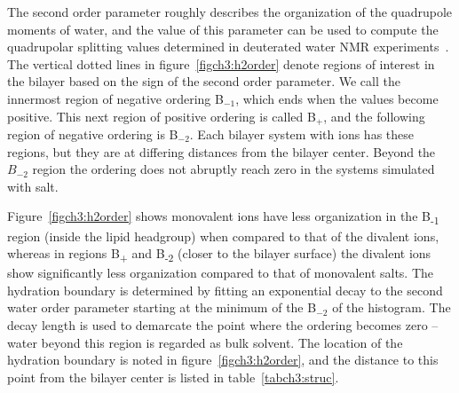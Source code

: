 The second order parameter
roughly describes the organization of the quadrupole moments of water, {and the value of this parameter
can be used to compute the} quadrupolar splitting values determined in 
deuterated water NMR experiments~\cite{aaman:2003,kruczek:2017:ether}.
The vertical dotted lines in figure~\ref{figch3:h2order} denote regions of interest in the bilayer 
based on the {sign} of the second order parameter. We call the innermost region of negative ordering
B$_{-1}$, which ends when the values become positive. This next region of positive ordering is
called B$_{+}$, and the following region of negative ordering is B$_{-2}$. Each bilayer system with ions
has these regions, but they are at differing distances from the bilayer center.
Beyond the $B_{-2}$ region the ordering does not abruptly reach zero in the systems
simulated with salt.

{
    Figure~\ref{figch3:h2order} shows monovalent ions have 
    less organization in the B\textsubscript{-1} region (inside the lipid headgroup) when compared to that of the divalent ions,  
    whereas in regions B\textsubscript{+} and B\textsubscript{-2} (closer to the bilayer surface) the divalent ions show significantly
    less organization compared to that of monovalent salts.} 
The hydration boundary is determined by  
fitting an exponential decay to the second water order parameter starting
at the minimum of the B$_{-2}$ of the histogram.
The decay length is used to demarcate the point where the ordering becomes zero -- water beyond this region is
regarded as bulk solvent. The location of the hydration boundary 
is noted in figure~\ref{figch3:h2order}, and the distance 
to this point from the bilayer center is listed in table~\ref{tabch3:struc}.

